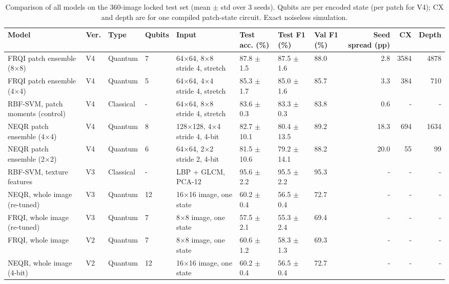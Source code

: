 \begin{table}[!t]
\centering
\caption{Comparison of all models on the 360-image locked test set (mean $\pm$ std over 3 seeds). Qubits are per encoded state (per patch for V4); CX and depth are for one compiled patch-state circuit. Exact noiseless simulation.}
\label{tab:model_comparison}
\footnotesize
\begin{tabular}{llllllllrrr}
\toprule
\textbf{Model} & \textbf{Ver.} & \textbf{Type} & \textbf{Qubits} & \textbf{Input} & \textbf{Test acc. (\%)} & \textbf{Test F1 (\%)} & \textbf{Val F1 (\%)} & \textbf{Seed spread (pp)} & \textbf{CX} & \textbf{Depth} \\
\midrule
FRQI patch ensemble (8$\times$8) & V4 & Quantum & 7 & 64$\times$64, 8$\times$8 stride 4, stretch & 87.8 $\pm$ 1.5 & 87.5 $\pm$ 1.6 & 88.0 & 2.8 & 3584 & 4878 \\
FRQI patch ensemble (4$\times$4) & V4 & Quantum & 5 & 64$\times$64, 4$\times$4 stride 4, stretch & 85.3 $\pm$ 1.7 & 85.0 $\pm$ 1.6 & 85.7 & 3.3 & 384 & 710 \\
RBF-SVM, patch moments (control) & V4 & Classical & - & 64$\times$64, 8$\times$8 stride 4, stretch & 83.6 $\pm$ 0.3 & 83.3 $\pm$ 0.3 & 83.8 & 0.6 & - & - \\
NEQR patch ensemble (4$\times$4) & V4 & Quantum & 8 & 128$\times$128, 4$\times$4 stride 4, 4-bit & 82.7 $\pm$ 10.1 & 80.4 $\pm$ 13.5 & 89.2 & 18.3 & 694 & 1634 \\
NEQR patch ensemble (2$\times$2) & V4 & Quantum & 6 & 64$\times$64, 2$\times$2 stride 2, 4-bit & 81.5 $\pm$ 10.6 & 79.2 $\pm$ 14.1 & 88.2 & 20.0 & 55 & 99 \\
\midrule
RBF-SVM, texture features & V3 & Classical & - & LBP + GLCM, PCA-12 & 95.6 $\pm$ 2.2 & 95.5 $\pm$ 2.2 & 95.3 & - & - & - \\
NEQR, whole image (re-tuned) & V3 & Quantum & 12 & 16$\times$16 image, one state & 60.2 $\pm$ 0.4 & 56.5 $\pm$ 0.4 & 72.7 & - & - & - \\
FRQI, whole image (re-tuned) & V3 & Quantum & 7 & 8$\times$8 image, one state & 57.5 $\pm$ 2.1 & 55.3 $\pm$ 2.4 & 69.4 & - & - & - \\
\midrule
FRQI, whole image & V2 & Quantum & 7 & 8$\times$8 image, one state & 60.6 $\pm$ 1.2 & 58.3 $\pm$ 1.3 & 69.3 & - & - & - \\
NEQR, whole image (4-bit) & V2 & Quantum & 12 & 16$\times$16 image, one state & 60.2 $\pm$ 0.4 & 56.5 $\pm$ 0.4 & 72.7 & - & - & - \\
\bottomrule
\end{tabular}
\end{table}
